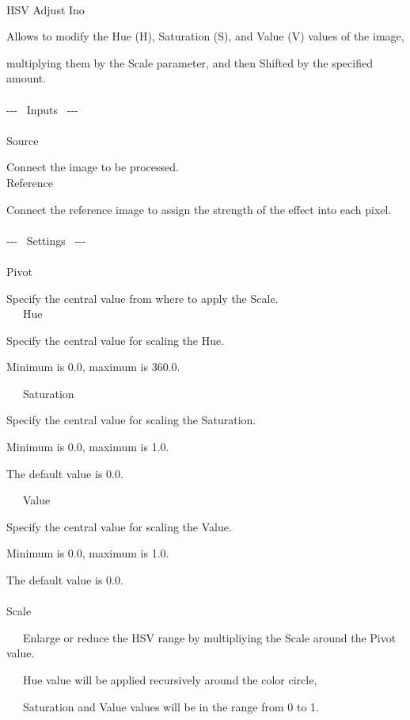 \documentclass[a4paper,12pt]{article}
\begin{document}
\thispagestyle{empty}

\Large
\noindent \\
HSV Adjust Ino\medskip
\par
\normalsize
Allows to modify the Hue (H), Saturation (S), and Value (V) values of the image,\par 
multiplying them by the Scale parameter, and then Shifted by the specified amount.\\
\\
-{-}- \ Inputs \ -{-}-\\
\\
Source\par
Connect the image to be processed.\\
Reference\par
Connect the reference image to assign the strength of the effect into each pixel.\\
\\
-{-}- \ Settings \ -{-}-\\
\\
Pivot\par
Specify the central value from where to apply the Scale.\\

\noindent \ \ \, Hue\par
Specify the central value for scaling the Hue.\par
Minimum is 0.0, maximum is 360.0.\par
\noindent \ \ \, Saturation\par
Specify the central value for scaling the Saturation.\par
Minimum is 0.0, maximum is 1.0.\par
The default value is 0.0.\par
\noindent \ \ \, Value\par
Specify the central value for scaling the Value.\par
Minimum is 0.0, maximum is 1.0.\par
The default value is 0.0.\\
\\
Scale\par
\noindent \ \ \, Enlarge or reduce the HSV range by multipliying the Scale around the Pivot value.\par
\noindent \ \ \, Hue value will be applied recursively around the color circle,\par
\noindent \ \ \, Saturation and Value values will be in the range from 0 to 1.\\
\end{document}
